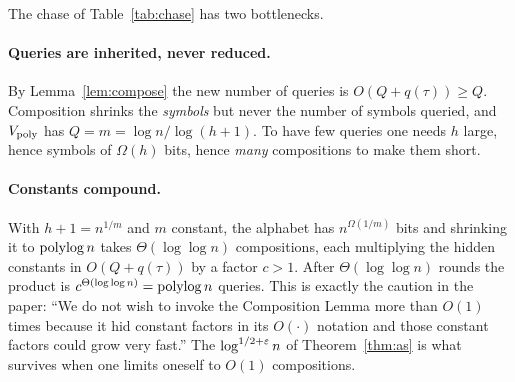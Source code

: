 The chase of Table~\ref{tab:chase} has two bottlenecks.

\paragraph{Queries are inherited, never reduced.}  By Lemma~\ref{lem:compose} the new number of queries is $O(Q+q(\tau))\ge Q$.  Composition shrinks the \emph{symbols} but never the number of symbols queried,
and $V_{\rm poly}$ has $Q=m=\log n/\log(h+1)$.  To have few queries one needs $h$ large, hence symbols of $\Omega(h)$ bits, hence \emph{many} compositions to make them short.

\paragraph{Constants compound.}  With $h+1=n^{1/m}$ and $m$ constant, the alphabet has $n^{\Omega(1/m)}$ bits and shrinking it to $\operatorname{polylog} n$ takes $\Theta(\log\log n)$ compositions, each
multiplying the hidden constants in $O(Q+q(\tau))$ by a factor $c>1$.  After $\Theta(\log\log n)$ rounds the product is $c^{\Theta(\log\log n)}=\operatorname{polylog} n$ queries.  This is exactly the caution in
the paper: ``We do not wish to invoke the Composition Lemma more than $O(1)$ times because it hid constant factors in its $O(\cdot)$ notation and those constant factors could grow very fast.''  The $\log^{1/2+\varepsilon}n$ of Theorem~\ref{thm:as}
is what survives when one limits oneself to $O(1)$ compositions.

